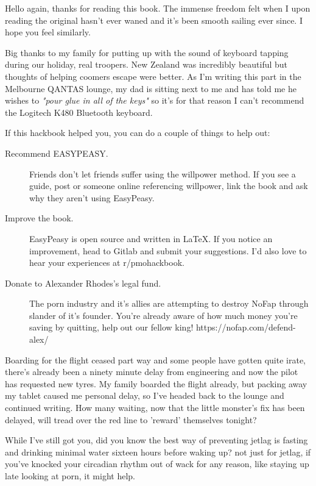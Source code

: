 \documentclass[easypeasy.tex]{subfiles}
\begin{document}
Hello again, thanks for reading this book. The immense freedom felt when I upon reading the original hasn't ever waned and it's been smooth sailing ever since. I hope you feel similarly.

Big thanks to my family for putting up with the sound of keyboard tapping during our holiday, real troopers. New Zealand was incredibly beautiful but thoughts of helping coomers escape were better. As I'm writing this part in the Melbourne QANTAS lounge, my dad is sitting next to me and has told me he wishes to \textit{"pour glue in all of the keys"} so it's for that reason I can't recommend the Logitech K480 Bluetooth keyboard.

If this hackbook helped you, you can do a couple of things to help out:
  \begin{description}
  \item [Recommend EASYPEASY.] Friends don't let friends suffer using the willpower method. If you see a guide, post or someone online referencing willpower, link the book and ask why they aren't using EasyPeasy.

  \item [Improve the book.] EasyPeasy is open source and written in LaTeX. If you notice an improvement, head to Gitlab and submit your suggestions. I'd also love to hear your experiences at r/pmohackbook.

  \item [Donate to Alexander Rhodes's legal fund.] The porn industry and it's allies are attempting to destroy NoFap through slander of it's founder. You're already aware of how much money you're saving by quitting, help out our fellow king! https://nofap.com/defend-alex/
  \end{description}

Boarding for the flight ceased part way and some people have gotten quite irate, there's already been a ninety minute delay from engineering and now the pilot has requested new tyres. My family boarded the flight already, but packing away my tablet caused me personal delay, so I've headed back to the lounge and continued writing. How many waiting, now that the little monster's fix has been delayed, will tread over the red line to 'reward' themselves tonight?

While I've still got you, did you know the best way of preventing jetlag is fasting and drinking minimal water sixteen hours before waking up? not just for jetlag, if you've knocked your circadian rhythm out of wack for any reason, like staying up late looking at porn, it might help.
\end{document}
